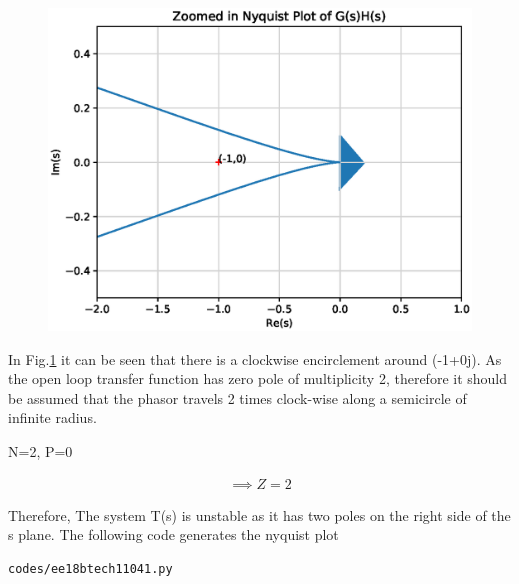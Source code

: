 \begin{enumerate}[label=\thesection.\arabic*.,ref=\thesection.\theenumi]
\begin{figure}[!h]
    \includegraphics[width=\columnwidth]{./figs/ee18btech11041_2.eps}
    \caption{}
    \label{fig:ee18btech11041_fig2}
\end{figure}


In Fig.\ref{fig:ee18btech11041_fig2} it can be seen that there is a clockwise encirclement around (-1+0j).
As the open loop transfer function has zero pole of multiplicity 2, therefore it should be assumed that the phasor travels 2 times clock-wise along a semicircle of infinite radius. 

\begin{center}
N=2, P=0    
\end{center}

\begin{align}
    \implies Z = 2
\end{align}

Therefore, The system T(s) is unstable as it has two poles on the right side of the s plane. 
The following code generates the nyquist plot
\begin{lstlisting}
codes/ee18btech11041.py
\end{lstlisting}


\end{enumerate}
